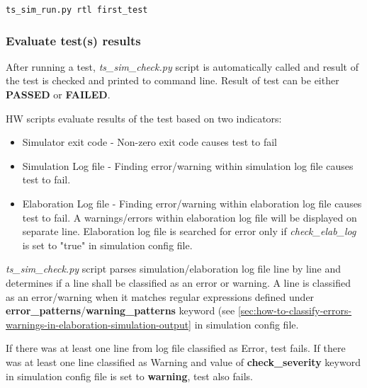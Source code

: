 \documentclass{tropic_design_spec}
\begin{document}
\begin{lstlisting}
ts_sim_run.py rtl first_test
\end{lstlisting}



\subsubsection{Evaluate test(s) results}
\label{sec:evaluate-test-results}

After running a test, \textit{ts_sim_check.py} script is automatically called and
result of the test is checked and printed to command line. Result of test can be either
\textbf{PASSED} or \textbf{FAILED}.

HW scripts evaluate results of the test based on two indicators:
\begin{itemize}
    \item Simulator exit code - Non-zero exit code causes test to fail
    \item Simulation Log file - Finding error/warning within simulation log
                                file causes test to fail.
    \item Elaboration Log file - Finding error/warning within elaboration log
                                file causes test to fail. A warnings/errors within elaboration
                                log file will be displayed on separate line. Elaboration log
                                file is searched for error only if \textit{check_elab_log} is set
                                to "true" in simulation config file.
\end{itemize}

\textit{ts_sim_check.py} script parses simulation/elaboration log file line by line and
determines if a line shall be classified as an error or warning. A line is classified
as an error/warning when it matches regular expressions defined under
\textbf{error_patterns}/\textbf{warning_patterns} keyword (see
\ref{sec:how-to-classify-errors-warnings-in-elaboration-simulation-output} in simulation
config file.

If there was at least one line from log file classified as Error, test fails.
If there was at least one line classified as Warning and value of
\textbf{check_severity} keyword in simulation config file is set to
\textbf{warning}, test also fails.
\end{document}
